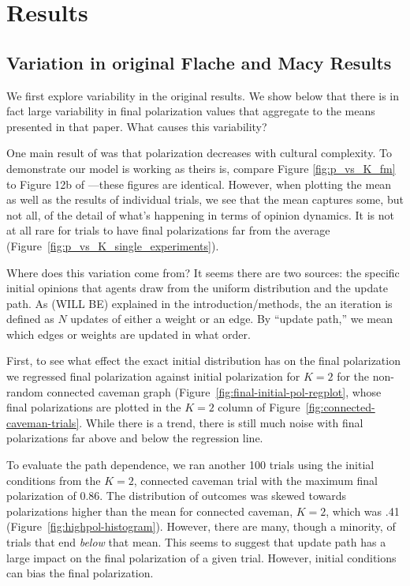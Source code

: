 \documentclass[11pt,letterpaper]{article}
\begin{document}
\section{Results}

\subsection{Variation in original Flache and Macy Results}

We first explore variability in the original  results.
We show below that there is in fact large variability in final polarization
values that aggregate to the means presented in that paper. What causes
this variability? 

One main result of
 was that polarization decreases with cultural complexity.
To demonstrate our model is working as theirs is, compare Figure 
\ref{fig:p_vs_K_fm} to Figure 12b of ---these figures
are identical.
However, when plotting the mean as well as the results of individual trials,
we see that the mean captures some, but not all, of the detail of what's 
happening in terms of opinion dynamics. It is not at all rare for trials to
have final polarizations far from the average 
(Figure~\ref{fig:p_vs_K_single_experiments}). 


Where does
this variation come from? It seems there are two sources: the specific
initial opinions that agents draw from the uniform distribution and the
update path. As (WILL BE) explained in the introduction/methods, 
the  an iteration is defined as $N$ updates of either a 
weight or an edge.  By ``update path,'' we mean which edges or weights are 
updated in what order. 

First, to see what effect the exact initial distribution has on the final 
polarization we regressed final polarization against initial polarization for
$K=2$ for the non-random connected caveman graph 
(Figure~\ref{fig:final-initial-pol-regplot}, whose final polarizations are 
plotted in the $K=2$ column of Figure~\ref{fig:connected-caveman-trials}.
While there is a trend, there is still much noise with final polarizations
far above and below the regression line. 

To evaluate the path dependence, we ran another 100 trials using the initial
conditions from the $K=2$, connected caveman trial
with the maximum final polarization of 0.86. The distribution of outcomes was
skewed towards polarizations higher than the mean for connected caveman, $K=2$,
which was .41 (Figure~\ref{fig:highpol-histogram}). However, there are many,
though a minority, of trials that end \emph{below} that mean. This seems to
suggest that update path has a large impact on the final polarization of a
given trial. However, initial conditions can bias the final polarization. 
\end{document}
